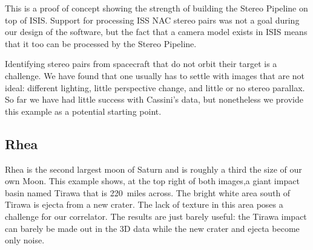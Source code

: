This is a proof of concept showing the strength of building the Stereo
Pipeline on top of \ac{ISIS}.  Support for processing ISS NAC stereo pairs
was not a goal during our design of the software, but the fact that a
camera model exists in \ac{ISIS} means that it too can be processed by the
Stereo Pipeline.

Identifying stereo pairs from spacecraft that do not orbit their
target is a challenge. We have found that one usually has to settle
with images that are not ideal: different lighting, little perspective
change, and little or no stereo parallax. So far we have had little
success with Cassini's data, but nonetheless we provide this example
as a potential starting point.

\subsection{Rhea}

Rhea is the second largest moon of Saturn and is roughly a third the
size of our own Moon. This example shows, at the top right of both
images,a giant impact basin named Tirawa that is 220~miles across. The
bright white area south of Tirawa is ejecta from a new crater.  The
lack of texture in this area poses a challenge for our correlator. The
results are just barely useful: the Tirawa impact can barely be made
out in the 3D data while the new crater and ejecta become only noise.

